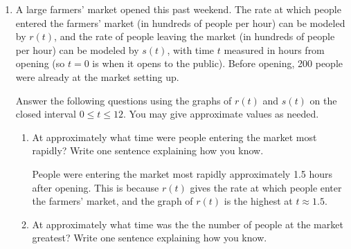 \documentclass{article}
\begin{document}
\begin{enumerate}
\item 

\begin{problem}
A large farmers' market opened this past weekend. The rate at which people entered the farmers' market (in hundreds of people per hour) can be modeled by $r(t)$, and the rate of people leaving the market (in hundreds of people per hour) can be modeled by $s(t)$, with time $t$ measured in hours from opening (so $t=0$ is when it opens to the public). Before opening, 200 people were already at the market setting up.
\end{problem}

\begin{center}
  \end{center}


Answer the following questions using the graphs of $r(t)$ and $s(t)$
on the closed interval $0 \leq t \leq 12$. You may give approximate values as needed.


\begin{enumerate}
    \item 
    \begin{problem}
    At approximately what time were people entering the market most rapidly? Write one sentence explaining how you know. 
    \end{problem}
    \pspace{\vfill}

    \begin{solution}
        People were entering the market most rapidly approximately 1.5 hours after opening. This is because $r(t)$ gives the rate at which people enter the farmers' market, and the graph of $r(t)$ is the highest at $t\approx 1.5$.
    \end{solution}
    
    \item 
    \begin{problem}
    At approximately what time was the the number of people at the market greatest? Write one sentence explaining how you know. 
    \end{problem}
    \pspace{\vfill}


\end{enumerate}
\end{enumerate}
\end{document}

